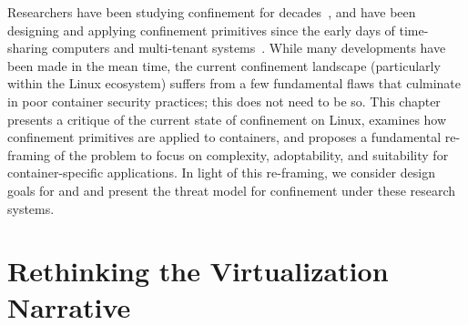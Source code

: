 Researchers have been studying confinement for decades~\cite{lampson1973_confinement}, and
have been designing and applying confinement primitives since the early days of
time-sharing computers and multi-tenant systems~\cite{shu2016_security_isolation_study}.
While many developments have been made in the mean time, the current confinement landscape
(particularly within the Linux ecosystem) suffers from a few fundamental flaws that
culminate in poor container security practices; this does not need to be so. This chapter
presents a critique of the current state of confinement on Linux, examines how confinement
primitives are applied to containers, and proposes a fundamental re-framing of the problem
to focus on complexity, adoptability, and suitability for container-specific applications.
In light of this re-framing, we consider design goals for \bpfbox{} and \bpfcontain{} and
present the threat model for confinement under these research systems.

\section{Rethinking the Virtualization Narrative}%
\label{s:cp-rethinking}

